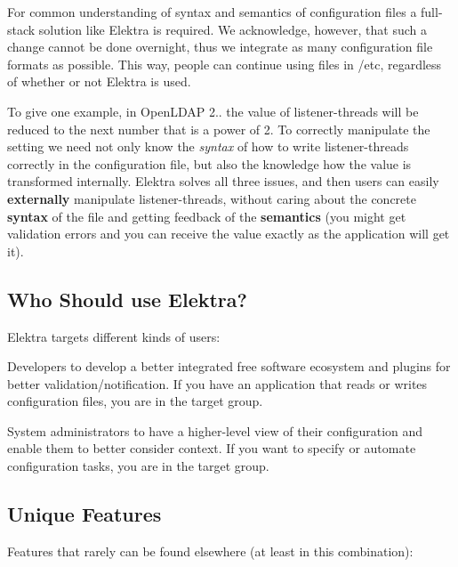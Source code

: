 For common understanding of syntax and semantics of configuration files a full-\/stack solution like Elektra is required. We acknowledge, however, that such a change cannot be done overnight, thus we integrate as many configuration file formats as possible. This way, people can continue using files in {\ttfamily /etc}, regardless of whether or not Elektra is used.

To give one example, in Open\+L\+D\+AP 2.. the value of {\ttfamily listener-\/threads} will be reduced to the next number that is a power of 2. To correctly manipulate the setting we need not only know the {\itshape syntax} of how to write listener-\/threads correctly in the configuration file, but also the knowledge how the value is transformed internally. Elektra solves all three issues, and then users can easily {\bfseries externally} manipulate {\ttfamily listener-\/threads}, without caring about the concrete {\bfseries syntax} of the file and getting feedback of the {\bfseries semantics} (you might get validation errors and you can receive the value exactly as the application will get it).

\subsection*{Who Should use Elektra?}

Elektra targets different kinds of users\+:


\begin{DoxyEnumerate}
\item Developers to develop a better integrated free software ecosystem and plugins for better validation/notification. If you have an application that reads or writes configuration files, you are in the target group.
\item System administrators to have a higher-\/level view of their configuration and enable them to better consider context. If you want to specify or automate configuration tasks, you are in the target group.
\end{DoxyEnumerate}

\subsection*{Unique Features}

Features that rarely can be found elsewhere (at least in this combination)\+:


